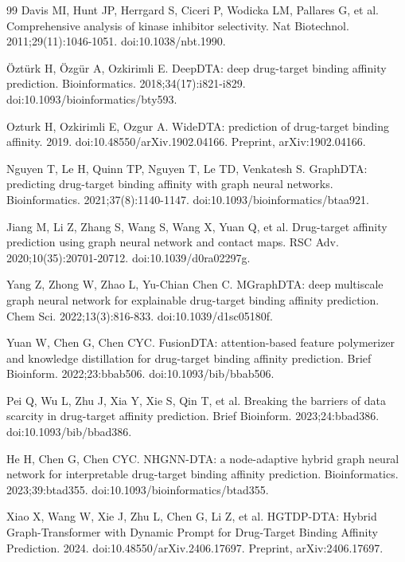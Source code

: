 \documentclass[12pt,a4paper]{article}
\begin{document}
\clearpage\begin{thebibliography}{99}
 Davis MI, Hunt JP, Herrgard S, Ciceri P, Wodicka LM, Pallares G, et al. Comprehensive analysis of kinase inhibitor selectivity. Nat Biotechnol. 2011;29(11):1046-1051. doi:10.1038/nbt.1990.

 Öztürk H, Özgür A, Ozkirimli E. DeepDTA: deep drug-target binding affinity prediction. Bioinformatics. 2018;34(17):i821-i829. doi:10.1093/bioinformatics/bty593.

 Ozturk H, Ozkirimli E, Ozgur A. WideDTA: prediction of drug-target binding affinity. 2019. doi:10.48550/arXiv.1902.04166. Preprint, arXiv:1902.04166.

 Nguyen T, Le H, Quinn TP, Nguyen T, Le TD, Venkatesh S. GraphDTA: predicting drug-target binding affinity with graph neural networks. Bioinformatics. 2021;37(8):1140-1147. doi:10.1093/bioinformatics/btaa921.

 Jiang M, Li Z, Zhang S, Wang S, Wang X, Yuan Q, et al. Drug-target affinity prediction using graph neural network and contact maps. RSC Adv. 2020;10(35):20701-20712. doi:10.1039/d0ra02297g.

 Yang Z, Zhong W, Zhao L, Yu-Chian Chen C. MGraphDTA: deep multiscale graph neural network for explainable drug-target binding affinity prediction. Chem Sci. 2022;13(3):816-833. doi:10.1039/d1sc05180f.

 Yuan W, Chen G, Chen CYC. FusionDTA: attention-based feature polymerizer and knowledge distillation for drug-target binding affinity prediction. Brief Bioinform. 2022;23:bbab506. doi:10.1093/bib/bbab506.

 Pei Q, Wu L, Zhu J, Xia Y, Xie S, Qin T, et al. Breaking the barriers of data scarcity in drug-target affinity prediction. Brief Bioinform. 2023;24:bbad386. doi:10.1093/bib/bbad386.

 He H, Chen G, Chen CYC. NHGNN-DTA: a node-adaptive hybrid graph neural network for interpretable drug-target binding affinity prediction. Bioinformatics. 2023;39:btad355. doi:10.1093/bioinformatics/btad355.

 Xiao X, Wang W, Xie J, Zhu L, Chen G, Li Z, et al. HGTDP-DTA: Hybrid Graph-Transformer with Dynamic Prompt for Drug-Target Binding Affinity Prediction. 2024. doi:10.48550/arXiv.2406.17697. Preprint, arXiv:2406.17697.


\end{thebibliography}
\end{document}
